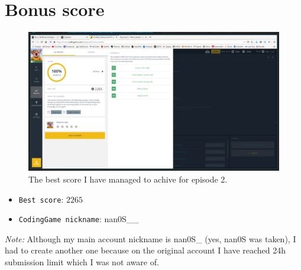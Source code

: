\documentclass[11pt]{article}
\begin{document}
 	\section{Bonus score}
	\begin{figure}[H]
 	\centering
	\includegraphics[scale=0.3]{screens/mars-lander-episode2-1} 	
	\caption{The best score I have managed to achive for episode 2.}
 	\end{figure}
 	
 	\begin{itemize}
 		\item[] \texttt{Best score}: $2265$
 		\item[] \texttt{CodingGame nickname}: nan0S\_\_
 	\end{itemize}
 	\textit{Note:} Although my main account nickname is nan0S\_ (yes, nan0S was taken), I had to create another one because on the original account I have reached 24h submission limit which I was not aware of.
 	
\end{document}
